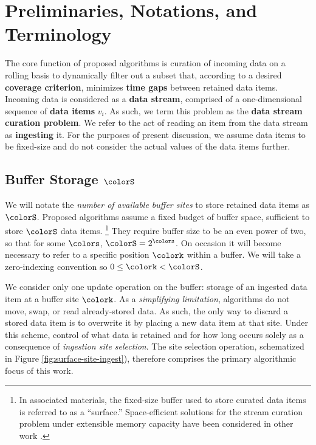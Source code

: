 \section{Preliminaries, Notations, and Terminology} \label{sec:notation}



The core function of proposed algorithms is curation of incoming data on a rolling basis to dynamically filter out a subset that, according to a desired \textbf{coverage criterion}, minimizes \textbf{time gaps} between retained data items.
Incoming data is considered as a \textbf{data stream}, comprised of a one-dimensional sequence of \textbf{data items} $v_i$.
As such, we term this problem as the \textbf{data stream curation problem}.
We refer to the act of reading an item from the data stream as \textbf{ingesting} it.
For the purposes of present discussion, we assume data items to be fixed-size and do not consider the actual values of the data items further.

\subsection{Buffer Storage $\colorS$}
\label{sec:notation-buffer}

We will notate the \textit{number of available buffer sites} to store retained data items as $\colorS$.
Proposed algorithms assume a fixed budget of buffer space, sufficient to store $\colorS$ data items.%
\footnote{%
In associated materials, the fixed-size buffer used to store curated data items is referred to as a ``surface.''
Space-efficient solutions for the stream curation problem under extensible memory capacity have been considered in other work \citep{moreno2024algorithms}.%
}
They require buffer size to be an even power of two, so that for some $\colors$, $\colorS = 2^{\colors}$.
On occasion it will become necessary to refer to a specific position $\colork$ within a buffer.
We will take a zero-indexing convention so $0 \leq \colork < \colorS$.

We consider only one update operation on the buffer: storage of an ingested data item at a buffer site $\colork$.
As a \textit{simplifying limitation}, algorithms do not move, swap, or read already-stored data.
As such, the only way to discard a stored data item is to overwrite it by placing a new data item at that site.
Under this scheme, control of what data is retained and for how long occurs solely as a consequence of \textit{ingestion site selection}.
The site selection operation, schematized in Figure \ref{fig:surface-site-ingest}), therefore comprises the primary algorithmic focus of this work.

